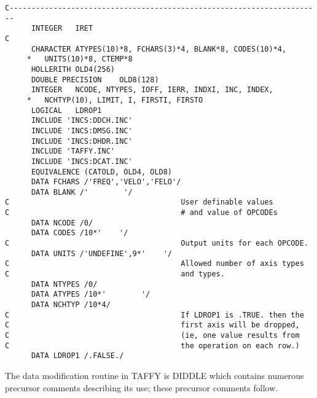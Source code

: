 \begin{verbatim}
C-----------------------------------------------------------------------
      INTEGER   IRET
C
      CHARACTER ATYPES(10)*8, FCHARS(3)*4, BLANK*8, CODES(10)*4,
     *   UNITS(10)*8, CTEMP*8
      HOLLERITH OLD4(256)
      DOUBLE PRECISION    OLD8(128)
      INTEGER   NCODE, NTYPES, IOFF, IERR, INDXI, INC, INDEX,
     *   NCHTYP(10), LIMIT, I, FIRSTI, FIRSTO
      LOGICAL   LDROP1
      INCLUDE 'INCS:DDCH.INC'
      INCLUDE 'INCS:DMSG.INC'
      INCLUDE 'INCS:DHDR.INC'
      INCLUDE 'TAFFY.INC'
      INCLUDE 'INCS:DCAT.INC'
      EQUIVALENCE (CATOLD, OLD4, OLD8)
      DATA FCHARS /'FREQ','VELO','FELO'/
      DATA BLANK /'        '/
C                                       User definable values
C                                       # and value of OPCODEs
      DATA NCODE /0/
      DATA CODES /10*'    '/
C                                       Output units for each OPCODE.
      DATA UNITS /'UNDEFINE',9*'    '/
C                                       Allowed number of axis types
C                                       and types.
      DATA NTYPES /0/
      DATA ATYPES /10*'        '/
      DATA NCHTYP /10*4/
C                                       If LDROP1 is .TRUE. then the
C                                       first axis will be dropped,
C                                       (ie, one value results from
C                                       the operation on each row.)
      DATA LDROP1 /.FALSE./

\end{verbatim}

 The data modification routine in TAFFY is DIDDLE which contains
numerous precursor comments describing its use;  these precursor
comments follow.

